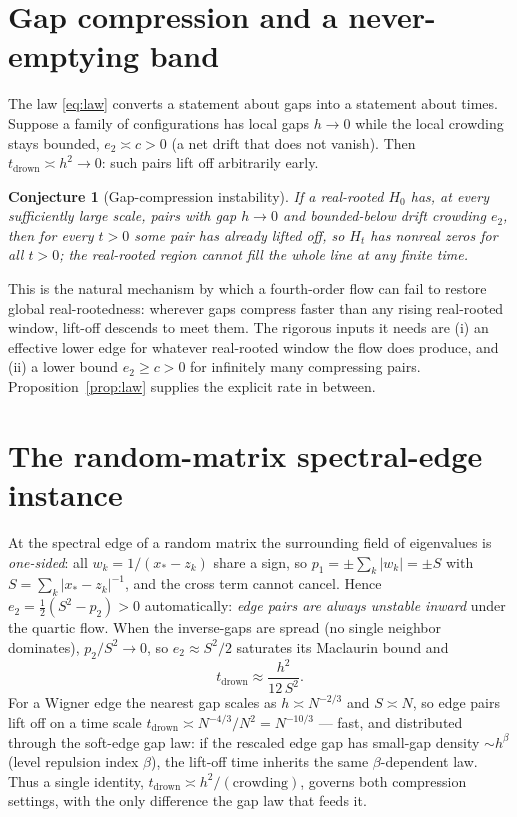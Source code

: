 \documentclass[11pt]{article}
\theoremstyle{plain}
\newtheorem{conjecture}{Conjecture}
\theoremstyle{definition}
\theoremstyle{remark}
\newcommand{\abs}[1]{\lvert #1\rvert}
\begin{document}
\section{Gap compression and a never-emptying band}
The law \eqref{eq:law} converts a statement about gaps into a statement about
times. Suppose a family of configurations has local gaps $h\to0$ while the local
crowding stays bounded, $e_2\asymp c>0$ (a net drift that does not vanish). Then
$t_{\mathrm{drown}}\asymp h^2\to0$: such pairs lift off arbitrarily early.

\begin{conjecture}[Gap-compression instability]\label{conj:gc}
If a real-rooted $H_0$ has, at every sufficiently large scale, pairs with gap
$h\to0$ and bounded-below drift crowding $e_2$, then for every $t>0$ some pair has
already lifted off, so $H_t$ has nonreal zeros for all $t>0$; the real-rooted
region cannot fill the whole line at any finite time.
\end{conjecture}

\noindent This is the natural mechanism by which a fourth-order flow can fail to
restore global real-rootedness: wherever gaps compress faster than any rising
real-rooted window, lift-off descends to meet them. The rigorous inputs it needs
are (i) an effective lower edge for whatever real-rooted window the flow does
produce, and (ii) a lower bound $e_2\ge c>0$ for infinitely many compressing
pairs. Proposition~\ref{prop:law} supplies the explicit rate in between.

\section{The random-matrix spectral-edge instance}
At the spectral edge of a random matrix the surrounding field of eigenvalues is
\emph{one-sided}: all $w_k=1/(x_*-z_k)$ share a sign, so $p_1=\pm\sum_k\abs{w_k}
=\pm S$ with $S=\sum_k\abs{x_*-z_k}^{-1}$, and the cross term cannot cancel.
Hence $e_2=\tfrac12(S^2-p_2)>0$ automatically: \emph{edge pairs are always
unstable inward} under the quartic flow. When the inverse-gaps are spread (no
single neighbor dominates), $p_2/S^2\to0$, so $e_2\approx S^2/2$ saturates its
Maclaurin bound and
\begin{equation}\label{eq:edge}
   t_{\mathrm{drown}}\approx\frac{h^2}{12\,S^2}.
\end{equation}
For a Wigner edge the nearest gap scales as $h\asymp N^{-2/3}$ and $S\asymp N$, so
edge pairs lift off on a time scale $t_{\mathrm{drown}}\asymp N^{-4/3}/N^{2}
=N^{-10/3}$ --- fast, and distributed through the soft-edge gap law: if the
rescaled edge gap has small-gap density $\sim h^{\beta}$ (level repulsion index
$\beta$), the lift-off time inherits the same $\beta$-dependent law. Thus a single
identity, $t_{\mathrm{drown}}\asymp h^2/(\text{crowding})$, governs both
compression settings, with the only difference the gap law that feeds it.
\end{document}
